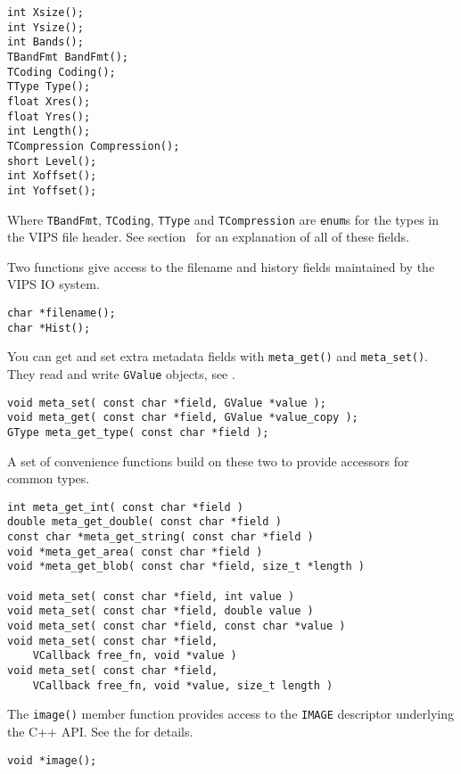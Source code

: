 \begin{verbatim}
int Xsize();
int Ysize();
int Bands();
TBandFmt BandFmt();
TCoding Coding();
TType Type();
float Xres();
float Yres();
int Length();
TCompression Compression();
short Level();
int Xoffset();
int Yoffset();
\end{verbatim}

\noindent
Where \verb+TBandFmt+, \verb+TCoding+, \verb+TType+ and \verb+TCompression+
are \verb+enum+s for the types in the VIPS file header. See
section~ for an explanation of all of these fields.

Two functions give access to the filename and history
fields maintained by the VIPS IO system.

\begin{verbatim}
char *filename();
char *Hist();
\end{verbatim}

You can get and set extra metadata fields with \verb+meta_get()+ and
\verb+meta_set()+. They read and write \verb+GValue+ objects, see 
.

\begin{verbatim}
void meta_set( const char *field, GValue *value );
void meta_get( const char *field, GValue *value_copy );
GType meta_get_type( const char *field );
\end{verbatim}

A set of convenience functions build on these two to provide accessors for
common types.

\begin{verbatim}
int meta_get_int( const char *field )
double meta_get_double( const char *field )
const char *meta_get_string( const char *field )
void *meta_get_area( const char *field )
void *meta_get_blob( const char *field, size_t *length ) 

void meta_set( const char *field, int value ) 
void meta_set( const char *field, double value )
void meta_set( const char *field, const char *value )
void meta_set( const char *field, 
	VCallback free_fn, void *value ) 
void meta_set( const char *field, 
	VCallback free_fn, void *value, size_t length ) 
\end{verbatim}

The \verb+image()+ member function provides access to the \verb+IMAGE+
descriptor underlying the C++ API. See the  for details.

\begin{verbatim}
void *image();
\end{verbatim}

